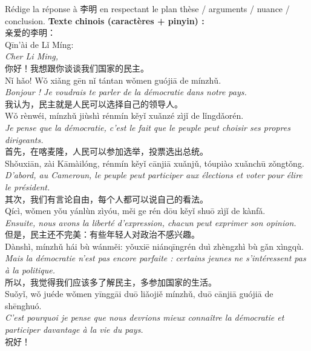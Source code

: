 \documentclass[11pt]{article}
\begin{document}
\begin{exoresolu}
Rédige la réponse à 李明 en respectant le plan thèse / arguments / nuance / conclusion.
\tcblower
\textbf{Texte chinois (caractères + pinyin) :}\\[4pt]
亲爱的李明：\\
Qīn'ài de Lǐ Míng:\\
\textit{Cher Li Ming,}\\[4pt]
你好！我想跟你谈谈我们国家的民主。\\
Nǐ hǎo! Wǒ xiǎng gēn nǐ tántan wǒmen guójiā de mínzhǔ.\\
\textit{Bonjour ! Je voudrais te parler de la démocratie dans notre pays.}\\[4pt]
我认为，民主就是人民可以选择自己的领导人。\\
Wǒ rènwéi, mínzhǔ jiùshì rénmín kěyǐ xuǎnzé zìjǐ de lǐngdǎorén.\\
\textit{Je pense que la démocratie, c'est le fait que le peuple peut choisir ses propres dirigeants.}\\[4pt]
首先，在喀麦隆，人民可以参加选举，投票选出总统。\\
Shǒuxiān, zài Kāmàilóng, rénmín kěyǐ cānjiā xuǎnjǔ, tóupiào xuǎnchū zǒngtǒng.\\
\textit{D'abord, au Cameroun, le peuple peut participer aux élections et voter pour élire le président.}\\[4pt]
其次，我们有言论自由，每个人都可以说自己的看法。\\
Qícì, wǒmen yǒu yánlùn zìyóu, měi ge rén dōu kěyǐ shuō zìjǐ de kànfǎ.\\
\textit{Ensuite, nous avons la liberté d'expression, chacun peut exprimer son opinion.}\\[4pt]
但是，民主还不完美：有些年轻人对政治不感兴趣。\\
Dànshì, mínzhǔ hái bù wánměi: yǒuxiē niánqīngrén duì zhèngzhì bù gǎn xìngqù.\\
\textit{Mais la démocratie n'est pas encore parfaite : certains jeunes ne s'intéressent pas à la politique.}\\[4pt]
所以，我觉得我们应该多了解民主，多参加国家的生活。\\
Suǒyǐ, wǒ juéde wǒmen yīnggāi duō liǎojiě mínzhǔ, duō cānjiā guójiā de shēnghuó.\\
\textit{C'est pourquoi je pense que nous devrions mieux connaître la démocratie et participer davantage à la vie du pays.}\\[4pt]
祝好！\\

\end{exoresolu}
\end{document}
